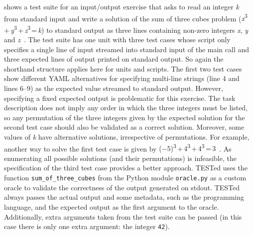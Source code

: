 \documentclass[../main]{subfiles}
\begin{document}
 shows a test suite for an input/output exercise that asks to read an integer \textit{k} from standard input and write a solution of the sum of three cubes problem ({\textit{x}\textsuperscript{3}\,+\,\textit{y}\textsuperscript{3}\,+\,\textit{z}\textsuperscript{3}\,=\,\textit{k}}) to standard output as three lines containing non-zero integers \textit{x}, \textit{y} and \textit{z}~\autocite{bookerCrackingProblem332019}.
The test suite has one unit with three test cases whose script only specifies a single line of input streamed into standard input of the main call and three expected lines of output printed on standard output.
So again the shorthand structure applies here for units and scripts.
The first two test cases show different YAML alternatives for specifying multi-line strings (line 4 and lines 6--9) as the expected value streamed to standard output.
However, specifying a fixed expected output is problematic for this exercise.
The task description does not imply any order in which the three integers must be listed, so any permutation of the three integers given by the expected solution for the second test case should also be validated as a correct solution.
Moreover, some values of \textit{k} have alternative solutions, irrespective of permutations.
For example, another way to solve the first test case is given by {(−5)\textsuperscript{3}\,+\,4\textsuperscript{3}\,+\,4\textsuperscript{3}\,=\,3}~\autocite{sutherlandSumsThreeCubes2019}.
As enumerating all possible solutions (and their permutations) is infeasible, the specification of the third test case provides a better approach.
TESTed uses the function \texttt{sum\_of\_three\_cubes} from the Python module \texttt{oracle.py} as a custom oracle to validate the correctness of the output generated on stdout.
TESTed always passes the actual output and some metadata, such as the programming language, and the expected output as the first argument to the oracle.
Additionally, extra arguments taken from the test suite can be passed (in this case there is only one extra argument: the integer \texttt{42}).
\end{document}
